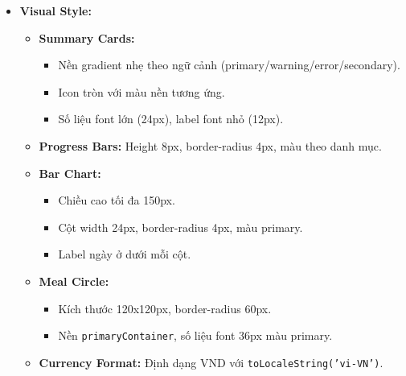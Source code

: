 \begin{itemize}
        \begin{itemize}
            \item \textbf{Tab Navigation:} \texttt{SegmentedButtons.onValueChange} cập nhật \texttt{activeTab} để render nội dung tương ứng.
            \item \textbf{Pull-to-refresh:} \texttt{RefreshControl} cho phép kéo xuống để reload dữ liệu báo cáo.
            \item \textbf{Download Action:} Nút download trên header (chức năng đang phát triển).
            \item \textbf{Horizontal Scroll:} Tab selector có thể cuộn ngang trên màn hình nhỏ.
        \end{itemize}
    \item \textbf{Visual Style:}
        \begin{itemize}
            \item \textbf{Summary Cards:}
                \begin{itemize}
                    \item Nền gradient nhẹ theo ngữ cảnh (primary/warning/error/secondary).
                    \item Icon tròn với màu nền tương ứng.
                    \item Số liệu font lớn (24px), label font nhỏ (12px).
                \end{itemize}
            \item \textbf{Progress Bars:} Height 8px, border-radius 4px, màu theo danh mục.
            \item \textbf{Bar Chart:}
                \begin{itemize}
                    \item Chiều cao tối đa 150px.
                    \item Cột width 24px, border-radius 4px, màu primary.
                    \item Label ngày ở dưới mỗi cột.
                \end{itemize}
            \item \textbf{Meal Circle:}
                \begin{itemize}
                    \item Kích thước 120x120px, border-radius 60px.
                    \item Nền \texttt{primaryContainer}, số liệu font 36px màu primary.
                \end{itemize}
            \item \textbf{Currency Format:} Định dạng VND với \texttt{toLocaleString('vi-VN')}.

\end{itemize}
\end{itemize}
